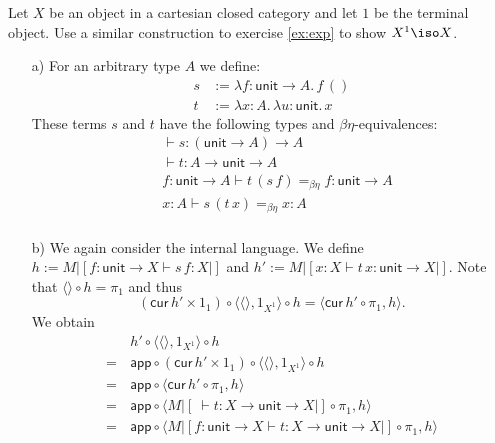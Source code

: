 \begin{exercise}
    Let $X$ be an object in a cartesian closed category and let $1$ be the terminal object.
    Use a similar construction to exercise \ref{ex:exp} to show $X^1 \iso X$.
\end{exercise}
\begin{answer}
    \begin{itemize}
        \item[a)] For an arbitrary type $A$ we define:
            \begin{align*}
                s & := \lambda f: \mathsf{unit} \to A.\, f\,()\\
                t & := \lambda x: A.\,\lambda u: \mathsf{unit}.\,x
            \end{align*}
            These terms $s$ and $t$ have the following types and $\beta\eta$-equivalences:
            \begin{align*}
                & \vdash s: (\mathsf{unit} \to A) \to A\\
                & \vdash t: A \to \mathsf{unit} \to A\\
                & f: \mathsf{unit} \to A \vdash t\,(s\,f) =_{\beta\eta} f: \mathsf{unit} \to A\\
                & x: A \vdash s\,(t\,x) =_{\beta\eta} x: A\\
            \end{align*}
        \item[b)] We again consider the internal language.
            We define $h := M|[f: \mathsf{unit} \to X \vdash s\,f: X|]$ and $h':= M|[x: X \vdash t\,x : \mathsf{unit} \to X|]$.
            Note that $\langle\rangle \circ h = \pi_1$ and thus
            \[ (\mathsf{cur}\,h' \times 1_1) \circ \langle \langle\rangle, 1_{X^1} \rangle \circ h = \langle \mathsf{cur}\,h' \circ \pi_1, h \rangle. \]
            We obtain
            \begin{align*}
                    & h' \circ \langle \langle\rangle, 1_{X^1}\rangle \circ h\\
                =\, & \mathsf{app} \circ (\mathsf{cur}\,h' \times 1_1) \circ \langle\langle\rangle, 1_{X^1} \rangle \circ h\\
                =\, & \mathsf{app} \circ \langle \mathsf{cur}\,h' \circ \pi_1, h \rangle \\
                =\, & \mathsf{app} \circ \langle M|[\ \vdash t: X \to \mathsf{unit} \to X|] \circ \pi_1, h \rangle \\
                =\, & \mathsf{app} \circ \langle M|[f: \mathsf{unit} \to X \vdash t: X \to \mathsf{unit} \to X|] \circ \pi_1, h \rangle \\

\end{align*}
\end{itemize}
\end{answer}

